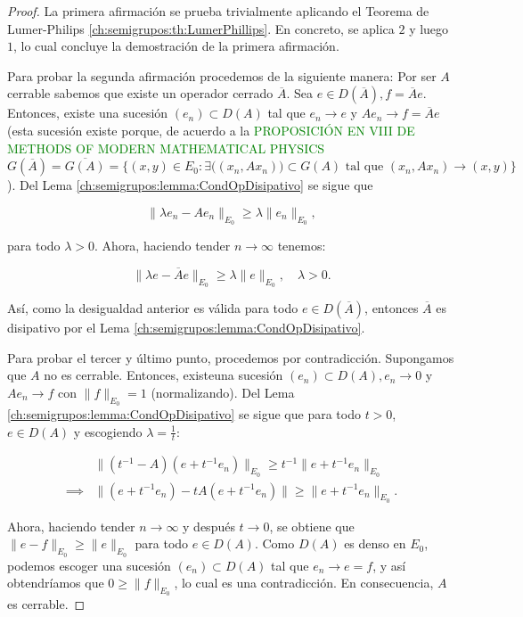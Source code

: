 \begin{proof}
    La primera afirmación se prueba trivialmente aplicando el Teorema de Lumer-Philips \ref{ch:semigrupos:th:LumerPhillips}. En concreto, se aplica $2$ y luego $1$, lo cual concluye la demostración de la primera afirmación.

    Para probar la segunda afirmación procedemos de la siguiente manera: Por ser $A$ cerrable sabemos que existe un operador cerrado $\overline{A}$. Sea $e \in D(\overline{A}), f = \overline{A}e$. Entonces, existe una sucesión $(e_n) \subset D(A)$ tal que $e_n \rightarrow e$ y $Ae_n \rightarrow f = \overline{A}e$ (esta sucesión existe porque, de acuerdo a la \textcolor{green}{PROPOSICIÓN EN VIII DE METHODS OF MODERN MATHEMATICAL PHYSICS} $G(\overline{A}) = \overline{G(A)} = \{(x, y) \in E_0 : \exists \big((x_n, Ax_n)\big) \subset G(A) \text{ tal que } (x_n, Ax_n) \rightarrow (x, y)\}$). Del Lema \ref{ch:semigrupos:lemma:CondOpDisipativo} se sigue que

    \[\lVert \lambda e_n - Ae_n \rVert_{E_0} \geq \lambda \lVert e_n \rVert_{E_0},\]

    para todo $\lambda >0 $. Ahora, haciendo tender $n \rightarrow \infty$ tenemos:

    \[\lVert\lambda e - \overline{A}e \rVert_{E_0} \geq \lambda \lVert e \rVert_{E_0}, \quad \lambda > 0.\]

    Así, como la desigualdad anterior es válida para todo $e \in D(\overline{A})$, entonces $\overline{A}$ es disipativo por el Lema \ref{ch:semigrupos:lemma:CondOpDisipativo}.

    Para probar el tercer y último punto, procedemos por contradicción. Supongamos que $A$ no es cerrable. Entonces, existe\footnotemark una sucesión $(e_n) \subset D(A), e_n \rightarrow 0$ y $Ae_n \rightarrow f$ con $\lVert f \rVert_{E_0} = 1$ (normalizando). Del Lema \ref{ch:semigrupos:lemma:CondOpDisipativo} se sigue que para todo $t > 0$, $e \in D(A)$ y escogiendo $\lambda = \frac{1}{t}$:

    \begin{align*}
        &\lVert (t^{-1}-A)(e+t^{-1}e_n)\rVert_{E_0} \geq t^{-1}\lVert e+t^{-1}e_n \rVert_{E_0}\\
        \implies& \lVert (e+t^{-1}e_n) - tA(e+t^{-1}e_n) \rVert \geq \lVert e+t^{-1}e_n \rVert_{E_0}.
    \end{align*}

    Ahora, haciendo tender $n \rightarrow \infty$ y después $t \rightarrow 0$, se obtiene que $\lVert e - f \rVert_{E_0} \geq \lVert e \rVert_{E_0}$ para todo $e \in D(A)$. Como $D(A)$ es denso en $E_0$, podemos escoger una sucesión $(e_n) \subset D(A)$ tal que $e_n \rightarrow e = f$, y así obtendríamos que $0 \geq \lVert f\rVert_{E_0}$, lo cual es una contradicción. En consecuencia, $A$ es cerrable.
\end{proof}

